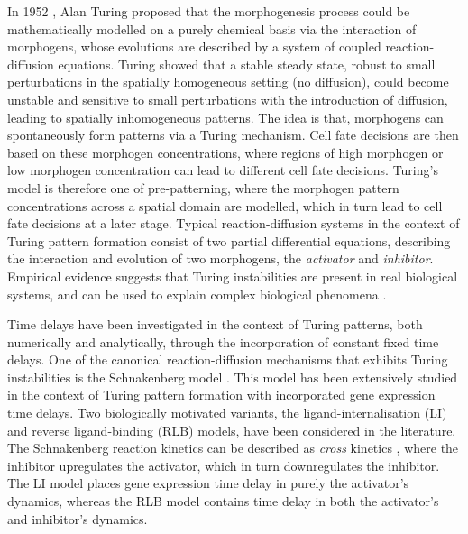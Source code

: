 In 1952 \cite{turing}, Alan Turing proposed that the morphogenesis process could be mathematically modelled on a purely chemical basis via the interaction of morphogens, whose evolutions are described by a system of coupled reaction-diffusion equations. Turing showed that a stable steady state, robust to small perturbations in the spatially homogeneous setting (no diffusion), could become unstable and sensitive to small perturbations with the introduction of diffusion, leading to spatially inhomogeneous patterns. The idea is that, morphogens can spontaneously form patterns via a Turing mechanism. Cell fate decisions are then based on these morphogen concentrations, where regions of high morphogen or low morphogen concentration can lead to different cell fate decisions. Turing's model is therefore one of pre-patterning, where the morphogen pattern concentrations across a spatial domain are modelled, which in turn lead to cell fate decisions at a later stage. Typical reaction-diffusion systems in the context of Turing pattern formation consist of two partial differential equations, describing the interaction and evolution of two morphogens, the \textit{activator} and \textit{inhibitor}. Empirical evidence suggests that Turing instabilities are present in real biological systems, and can be used to explain complex biological phenomena \cite{yigaffneyli,molecular,miura,miura4,sick}.

Time delays have been investigated in the context of Turing patterns, both numerically and analytically, through the incorporation of constant fixed time delays. One of the canonical reaction-diffusion mechanisms that exhibits Turing instabilities is the Schnakenberg model \cite{schnakenberg}. This model has been extensively studied in the context of Turing pattern formation with incorporated gene expression time delays. Two biologically motivated variants, the ligand-internalisation (LI) and reverse ligand-binding (RLB) models, have been considered in the literature. The Schnakenberg reaction kinetics can be described as \textit{cross} kinetics \cite{leegaffney}, where the inhibitor upregulates the activator, which in turn downregulates the inhibitor. The LI model places gene expression time delay in purely the activator's dynamics, whereas the RLB model contains time delay in both the activator's and inhibitor's dynamics.

